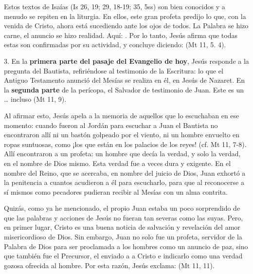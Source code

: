 \begin{body}
\begin{body}
Estos textos de Isaías (Is 26, 19; 29, 18-19; 35, 5ss) son bien conocidos y a menudo se repiten en la liturgia. En ellos, este gran profeta predijo lo que, con la venida de Cristo, ahora está sucediendo ante los ojos de todos. La Palabra se hizo carne, el anuncio se hizo realidad. Aquí: . Por lo tanto, Jesús afirma que todas estas  son confirmadas por su actividad, y concluye diciendo:  (Mt 11, 5. 4).

3. En la \textbf{primera parte del pasaje del Evangelio de hoy}, Jesús responde a la pregunta del Bautista, refiriéndose al testimonio de la Escritura: lo que el Antiguo Testamento anunció del Mesías se realiza en él, en Jesús de Nazaret. En la \textbf{segunda parte} de la perícopa, el Salvador de testimonio de Juan. Este es un  \ldots{} incluso  (Mt 11, 9).

Al afirmar esto, Jesús apela a la memoria de aquellos que lo escuchaban en ese momento: cuando fueron al Jordán para escuchar a Juan el Bautista no encontraron allí ni un bastón golpeado por el viento, ni un hombre envuelto en ropas suntuosas, como ¡los que están en los palacios de los reyes! (cf. Mt 11, 7-8). Allí encontraron a un profeta: un hombre que decía la verdad, y solo la verdad, en el nombre de Dios mismo. Esta verdad fue a veces dura y exigente. En el nombre del Reino, que se acercaba, en nombre del juicio de Dios, Juan exhortó a la penitencia a cuantos acudieron a él para escucharlo, para que al reconocerse a sí mismos como pecadores pudieran recibir al Mesías con un alma contrita.

Quizás, como ya he mencionado, el propio Juan estaba un poco sorprendido de que las palabras y acciones de Jesús no fueran tan severas como las suyas. Pero, en primer lugar, Cristo es una buena noticia de salvación y revelación del amor misericordioso de Dios. Sin embargo, Juan no solo fue un profeta, servidor de la Palabra de Dios para ser proclamada a los hombres como un anuncio de paz, sino que también fue el Precursor, el enviado a  a Cristo e indicarlo como una verdad gozosa ofrecida al hombre. Por esta razón, Jesús exclama:  (Mt 11, 11).


\end{body}
\end{body}
